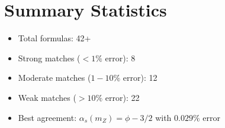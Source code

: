 \section{Summary Statistics}

\begin{itemize}
    \item Total formulas: 42+
    \item Strong matches ($<1\%$ error): 8
    \item Moderate matches ($1-10\%$ error): 12
    \item Weak matches ($>10\%$ error): 22
    \item Best agreement: $\alpha_s(m_Z) = \phi - 3/2$ with $0.029\%$ error
\end{itemize}

